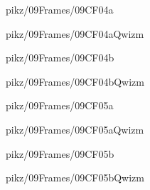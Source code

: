 \documentclass[9pt,xcolor={svgnames, x11names}]{beamer}
\begin{document}
\begin{frame}{pikz/09Frames/09CF04a}
  
\end{frame}


\begin{frame}{pikz/09Frames/09CF04aQwizm}
  
\end{frame}


\begin{frame}{pikz/09Frames/09CF04b}  
  
\end{frame}


\begin{frame}{pikz/09Frames/09CF04bQwizm}  
  
\end{frame}


\begin{frame}{pikz/09Frames/09CF05a}
  
\end{frame}


\begin{frame}{pikz/09Frames/09CF05aQwizm}
  
\end{frame}


\begin{frame}{pikz/09Frames/09CF05b}
  
\end{frame}


\begin{frame}{pikz/09Frames/09CF05bQwizm}
  
\end{frame}
\end{document}
